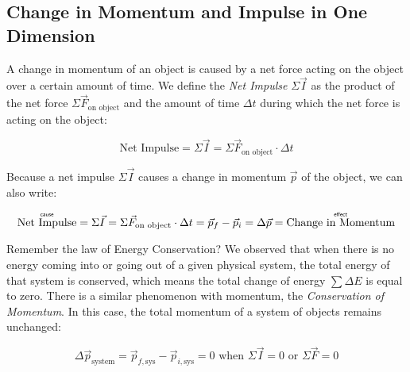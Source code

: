\WCD

\subsection{Change in Momentum and Impulse in One Dimension}
\label{act7.1.1a}


A change in momentum of an object is caused by a net force acting on the object over a certain amount of time. We define the \emph{Net Impulse} $\Sigma\vec{I}$ as the product of the net force $\Sigma\vec{F}_\text{on object}$ and the amount of time $\Delta t$ during which the net force is acting on the object:
\vspace{-5pt}

\begin{equation*}
	\text{Net Impulse} = \Sigma\vec{I} = \Sigma\vec{F}_\text{on object} \cdot \Delta t
\end{equation*}

\noindent Because a net impulse $\Sigma\vec{I}$ causes a change in momentum $\vec{p}$ of the object, we can also write:
\vspace{-10pt}

\begin{equation*}
	\overset{\mbox{\normalfont\tiny\sffamily cause}}{\text{Net Impulse}} = \Sigma\vec{I} = \Sigma\vec{F}_\text{on object} \cdot \Delta t = \vec{p}_f - \vec{p}_i = \Delta\vec{p} = \overset{\mbox{\normalfont\tiny\sffamily effect}}{\text{Change in Momentum}}
\end{equation*}

\noindent Remember the law of Energy Conservation? We observed that when there is no energy coming into or going out of a given physical system, the total energy of that system is conserved, which means the total change of energy $\sum\Delta E$ is equal to zero. There is a similar phenomenon with momentum, the \emph{Conservation of Momentum}. In this case, the total momentum of a system of objects remains unchanged:
\vspace{-5pt}

\begin{equation*}
	\Delta \vec{p}_\text{system} = \vec{p}_{f,\text{sys}} - \vec{p}_{i,\text{sys}} = 0 \text{  when  } \Sigma\vec{I} = 0 \text{  or  } \Sigma\vec{F} = 0	
\end{equation*}

